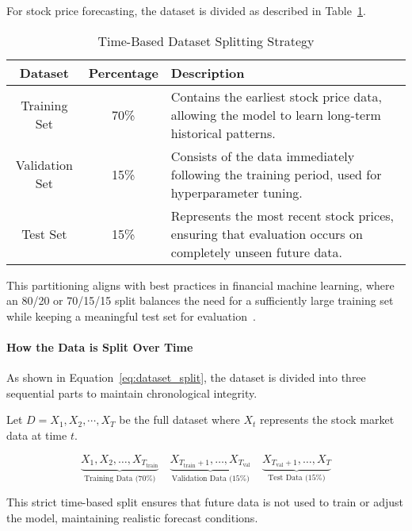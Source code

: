 For stock price forecasting, the dataset is divided as described 
in Table~\ref{tab:dataset_split}.

\begin{table}[H]
    \centering
    \caption{Time-Based Dataset Splitting Strategy}
    \label{tab:dataset_split}
    \begin{tabular}{ccp{9cm}}
        \hline
        \textbf{Dataset} & \textbf{Percentage} & \textbf{Description} \\
        \hline\hline
        Training Set & 70\% & Contains the earliest stock
        price data, allowing the model to learn long-term historical patterns. \\
        Validation Set & 15\% & Consists of the data immediately following 
        the training period, used for hyperparameter tuning. \\
        Test Set & 15\% & Represents the most recent stock prices, ensuring that 
        evaluation occurs on completely unseen future data. \\
        \hline
    \end{tabular}
\end{table}

This partitioning aligns with best practices in financial machine learning, 
where an 80/20 or 70/15/15 split balances the need for a sufficiently large 
training set while keeping a meaningful test set for 
evaluation~\parencite{chang2024StockPrediction}.

\paragraph{How the Data is Split Over Time}
As shown in Equation~\ref{eq:dataset_split}, the dataset is divided into three sequential parts to maintain chronological integrity.

Let $D={X_1,X_2,\cdots,X_T}$ be the full dataset where $X_t$ represents the stock market data at time $t$. 

\begin{equation}
\label{eq:dataset_split}
    \underbrace{X_1, X_2, \dots, X_{T_{\text{train}}}}_{\text{Training Data (70\%)}} \quad
    \underbrace{X_{T_{\text{train}}+1}, \dots, X_{T_{\text{val}}}}_{\text{Validation Data (15\%)}} \quad
    \underbrace{X_{T_{\text{val}}+1}, \dots, X_T}_{\text{Test Data (15\%)}} 
\end{equation}

This strict time-based split ensures that future data is not used to train or adjust the model, maintaining realistic forecast conditions\parencite{guo2024LSTMStock}.

